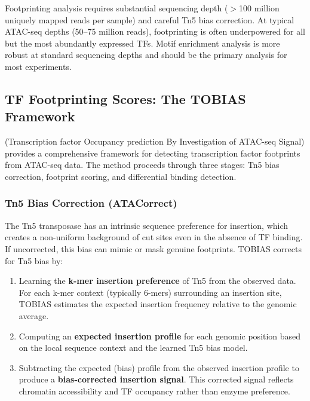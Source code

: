 \begin{warningbox}
Footprinting analysis requires substantial sequencing depth ($>$100 million uniquely mapped reads per sample) and careful Tn5 bias correction. At typical ATAC-seq depths (50--75 million reads), footprinting is often underpowered for all but the most abundantly expressed TFs. Motif enrichment analysis is more robust at standard sequencing depths and should be the primary analysis for most experiments.
\end{warningbox}

\subsection{TF Footprinting Scores: The TOBIAS Framework}
\label{subsec:chromatin:tobias-framework}

 (Transcription factor Occupancy prediction By Investigation of ATAC-seq Signal) provides a comprehensive framework for detecting transcription factor footprints from ATAC-seq data. The method proceeds through three stages: Tn5 bias correction, footprint scoring, and differential binding detection.

\subsubsection{Tn5 Bias Correction (ATACorrect)}

The Tn5 transposase has an intrinsic sequence preference for insertion, which creates a non-uniform background of cut sites even in the absence of TF binding. If uncorrected, this bias can mimic or mask genuine footprints. TOBIAS corrects for Tn5 bias by:

\begin{enumerate}[itemsep=2pt]
  \item Learning the \textbf{k-mer insertion preference} of Tn5 from the observed data. For each k-mer context (typically 6-mers) surrounding an insertion site, TOBIAS estimates the expected insertion frequency relative to the genomic average.
  \item Computing an \textbf{expected insertion profile} for each genomic position based on the local sequence context and the learned Tn5 bias model.
  \item Subtracting the expected (bias) profile from the observed insertion profile to produce a \textbf{bias-corrected insertion signal}. This corrected signal reflects chromatin accessibility and TF occupancy rather than enzyme preference.
\end{enumerate}

